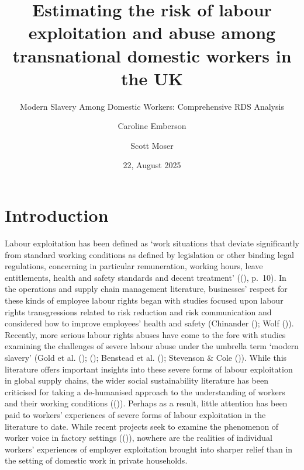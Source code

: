\documentclass[
  12pt,
]{article}
\title{Estimating the risk of labour exploitation and abuse among
transnational domestic workers in the UK}
\subtitle{Modern Slavery Among Domestic Workers: Comprehensive RDS
Analysis}
\author{Caroline Emberson \and Scott Moser}
\date{22, August 2025}
\theoremstyle{plain}
\theoremstyle{definition}
\renewcommand*\contentsname{Table of contents}
\newcommand\contentsname{Table of contents}
\begin{document}
\maketitle

\renewcommand*\contentsname{Table of contents}
{
\hypersetup{linkcolor=}
\setcounter{tocdepth}{3}
\tableofcontents
}

\newpage

\section{Introduction}\label{introduction}

Labour exploitation has been defined as `work situations that deviate
significantly from standard working conditions as defined by legislation
or other binding legal regulations, concerning in particular
remuneration, working hours, leave entitlements, health and safety
standards and decent treatment'
((),
p.~10). In the operations and supply chain management literature,
businesses' respect for these kinds of employee labour rights began with
studies focused upon labour rights transgressions related to risk
reduction and risk communication and considered how to improve
employees' health and safety (Chinander
(); Wolf
()). Recently, more
serious labour rights abuses have come to the fore with studies
examining the challenges of severe labour abuse under the umbrella term
`modern slavery' (Gold et al. ();
(); Benstead
et al. (); Stevenson \&
Cole ()). While this
literature offers important insights into these severe forms of labour
exploitation in global supply chains, the wider social sustainability
literature has been criticised for taking a de-humanised approach to the
understanding of workers and their working conditions
(()).
Perhaps as a result, little attention has been paid to workers'
experiences of severe forms of labour exploitation in the literature to
date. While recent projects seek to examine the phenomenon of worker
voice in factory settings
(()),
nowhere are the realities of individual workers' experiences of employer
exploitation brought into sharper relief than in the setting of domestic
work in private households.
\end{document}
